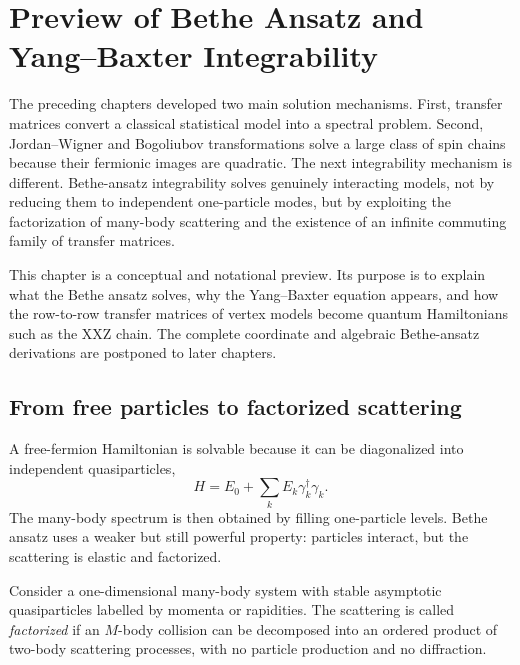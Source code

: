 \chapter[Bethe Ansatz and Yang--Baxter Integrability]{Preview of Bethe Ansatz and Yang--Baxter Integrability}
\label{chap:bethe-yang-baxter-preview}

The preceding chapters developed two main solution mechanisms.  First, transfer
matrices convert a classical statistical model into a spectral problem.  Second,
Jordan--Wigner and Bogoliubov transformations solve a large class of spin chains
because their fermionic images are quadratic.  The next integrability mechanism
is different.  Bethe-ansatz integrability solves genuinely interacting models,
not by reducing them to independent one-particle modes, but by exploiting the
factorization of many-body scattering and the existence of an infinite commuting
family of transfer matrices.

This chapter is a conceptual and notational preview.  Its purpose is to explain
what the Bethe ansatz solves, why the Yang--Baxter equation appears, and how the
row-to-row transfer matrices of vertex models become quantum Hamiltonians such as
the XXZ chain.  The complete coordinate and algebraic Bethe-ansatz derivations
are postponed to later chapters.

\section{From free particles to factorized scattering}
\label{sec:ba-factorized-scattering}

A free-fermion Hamiltonian is solvable because it can be diagonalized into
independent quasiparticles,
\begin{equation}
    H=E_0+\sum_k E_k\gamma_k^\dagger\gamma_k .
\end{equation}
The many-body spectrum is then obtained by filling one-particle levels.  Bethe
ansatz uses a weaker but still powerful property: particles interact, but the
scattering is elastic and factorized.

\begin{definition}
Consider a one-dimensional many-body system with stable asymptotic quasiparticles
labelled by momenta or rapidities.  The scattering is called \emph{factorized} if
an $M$-body collision can be decomposed into an ordered product of two-body
scattering processes, with no particle production and no diffraction.
\end{definition}

